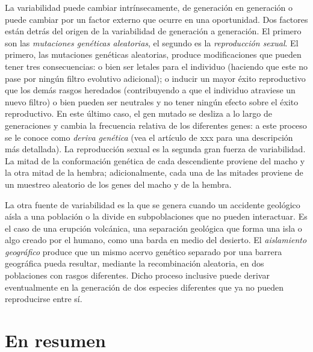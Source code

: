 \documentclass[
  letterpaper,
]{book}
\begin{document}
La variabilidad puede cambiar intrínsecamente, de generación en
generación o puede cambiar por un factor externo que ocurre en una
oportunidad. Dos factores están detrás del origen de la variabilidad de
generación a generación. El primero son las \emph{mutaciones genéticas
aleatorias}, el segundo es la \emph{reproducción sexual}. El primero,
las mutaciones genéticas aleatorias, produce modificaciones que pueden
tener tres consecuencias: o bien ser letales para el individuo (haciendo
que este no pase por ningún filtro evolutivo adicional); o inducir un
mayor éxito reproductivo que los demás rasgos heredados (contribuyendo a
que el individuo atraviese un nuevo filtro) o bien pueden ser neutrales
y no tener ningún efecto sobre el éxito reproductivo. En este último
caso, el gen mutado se desliza a lo largo de generaciones y cambia la
frecuencia relativa de los diferentes genes: a este proceso se le conoce
como \emph{deriva genética} (vea el artículo de xxx para una descripción
más detallada). La reproducción sexual es la segunda gran fuerza de
variabilidad. La mitad de la conformación genética de cada descendiente
proviene del macho y la otra mitad de la hembra; adicionalmente, cada
una de las mitades proviene de un muestreo aleatorio de los genes del
macho y de la hembra.

La otra fuente de variabilidad es la que se genera cuando un accidente
geológico aísla a una población o la divide en subpoblaciones que no
pueden interactuar. Es el caso de una erupción volcánica, una separación
geológica que forma una isla o algo creado por el humano, como una barda
en medio del desierto. El \emph{aislamiento geográfico} produce que un
mismo acervo genético separado por una barrera geográfica pueda
resultar, mediante la recombinación aleatoria, en dos poblaciones con
rasgos diferentes. Dicho proceso inclusive puede derivar eventualmente
en la generación de dos especies diferentes que ya no pueden
reproducirse entre sí.

\section{En resumen}\label{en-resumen}
\end{document}

